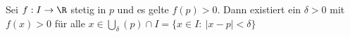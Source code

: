 Sei $f: I \to \R$ stetig in $p$ und es gelte $f(p) > 0$. Dann existiert ein $\delta > 0$ mit $f(x) > 0$ für alle $x \in \bigcup_\delta (p) \cap I = \{x \in I : \ |x-p| < \delta\}$